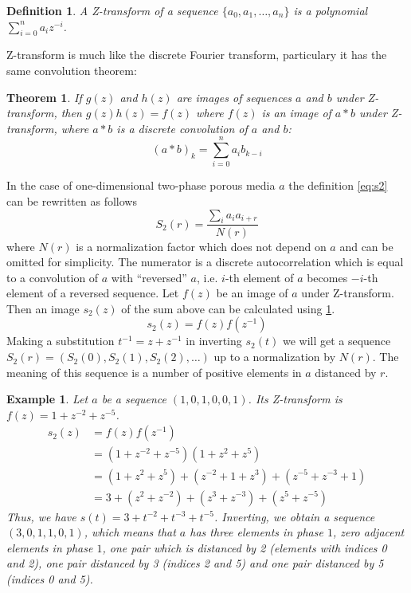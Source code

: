 \documentclass[12pt, a4paper]{article}
\newtheorem{definition}{Definition}
\newtheorem{example}{Example}
\newtheorem{theorem}{Theorem}
\begin{document}
\begin{definition}
  A Z-transform of a sequence $\{a_0, a_1, \dots, a_n\}$ is a polynomial
  $\sum_{i=0}^n a_i z^{-i}$.
\end{definition}
Z-transform is much like the discrete Fourier transform, particulary it has the
same convolution theorem:
\begin{theorem}
  If $g(z)$ and $h(z)$ are images of sequences $a$ and $b$ under Z-transform,
  then $g(z)h(z) = f(z)$ where $f(z)$ is an image of $a*b$ under Z-transform,
  where $a*b$ is a discrete convolution of $a$ and $b$:
  \begin{equation*}
    (a*b)_k = \sum_{i=0}^{n} a_i b_{k-i}
  \end{equation*}
  \label{th:conv}
\end{theorem}
In the case of one-dimensional two-phase porous media $a$ the definition
\ref{eq:s2} can be rewritten as follows
\begin{equation*}
  S_2(r) = \frac{\sum_{i}a_ia_{i+r}}{N(r)}
\end{equation*}
where $N(r)$ is a normalization factor which does not depend on $a$ and can be
omitted for simplicity. The numerator is a discrete autocorrelation which is
equal to a convolution of $a$ with ``reversed'' $a$, i.e. $i$-th element of $a$
becomes $-i$-th element of a reversed sequence. Let $f(z)$ be an image of $a$
under Z-transform. Then an image $s_2(z)$ of the sum above can be calculated
using \cref{th:conv}.
\begin{equation}
  s_2(z) = f(z)f(z^{-1})
  \label{eq:s2z}
\end{equation}
Making a substitution $t^{-1} = z + z^{-1}$ in inverting $s_2(t)$ we will get a
sequence $S_2(r) = (S_2(0), S_2(1), S_2(2), \dots)$ up to a normalization by
$N(r)$. The meaning of this sequence is a number of positive elements in $a$
distanced by $r$.
\begin{example}
  Let $a$ be a sequence $(1, 0, 1, 0, 0, 1)$. Its Z-transform is
  $f(z) = 1 + z^{-2} + z^{-5}$.
  \begin{align*}
    s_2(z) &= f(z)f(z^{-1}) \\
    &= (1 + z^{-2} + z^{-5})(1 + z^2 + z^5) \\
    &= (1 + z^2 + z^5) + (z^{-2} + 1 + z^3) + (z^{-5} + z^{-3} + 1) \\
    &= 3 + (z^2 + z^{-2}) + (z^3 + z^{-3}) + (z^5 + z^{-5})
  \end{align*}
  Thus, we have $s(t) = 3 + t^{-2} + t^{-3} + t^{-5}$. Inverting, we obtain a
  sequence $(3, 0, 1, 1, 0, 1)$, which means that $a$ has three elements in
  phase $1$, zero adjacent elements in phase $1$, one pair which is distanced by
  2 (elements with indices 0 and 2), one pair distanced by 3 (indices 2 and 5)
  and one pair distanced by 5 (indices 0 and 5).
\end{example}
\end{document}
